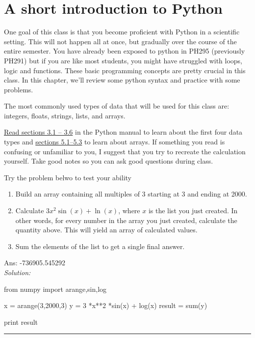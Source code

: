 \chapter{A short introduction to Python}
One goal of this class is that you become proficient with Python in a
scientific setting.  This will not happen all at once, but gradually
over the course of the entire semester.  You have already been exposed
to python in PH295 (previously PH291) but if you are like most
students, you might have struggled with loops, logic and functions.
These basic programming concepts are pretty crucial in this class.  In
this chapter, we'll review some python syntax and practice with some problems.

 The most commonly used types of data that will
be used for this class are: integers, floats, strings, lists, and
arrays.  

\ul{Read sections 3.1 -- 3.6} in the Python manual to learn
  about the first four data types and \ul{sections 5.1--5.3} to learn
  about arrays.  If something you read is confusing or unfamiliar to
  you, I suggest that you try to recreate the calculation yourself.
  Take good notes so you can ask good questions during class.

Try the problem belwo to test your ability
\begin{enumerate}
\probtwo 

\item Build an array containing all multiples of 3 starting at 3 and
  ending at 2000.
\item Calculate $3 x^2 \sin(x) + \ln(x)$, where $x$ is the list you
  just created.  In other words, for every number in the array you
  just created, calculate the quantity above.  This will yield an
  array of calculated values.
\item Sum the elements of the list to get a single final answer.  
\end{enumerate}
Ans: -736905.545292\\
\ifsolutions
\textit{Solution:}\\
\begin{codeexample}
\begin{VerbatimOut}{\listingFile}
from numpy import arange,sin,log

x = arange(3,2000,3)
y = 3 *x**2 *sin(x) + log(x)
result = sum(y)

print result
\end{VerbatimOut}
\end{codeexample}
\else
\noindent\rule{5 in}{0.01 in}
\fi


